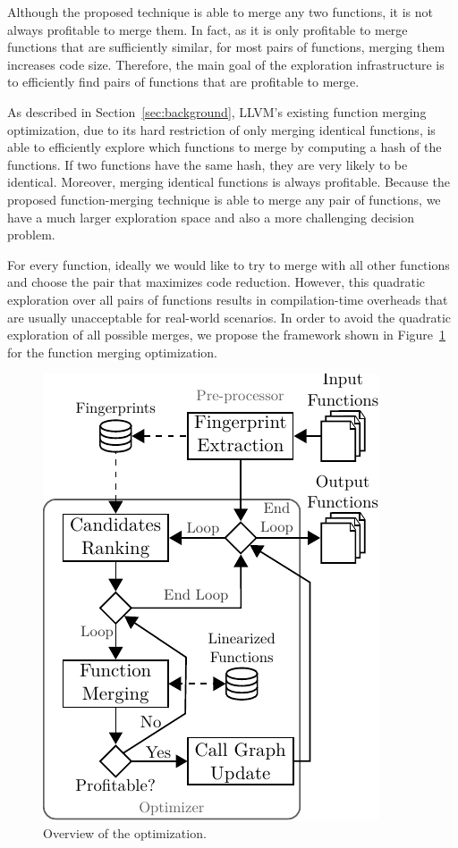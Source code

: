 Although the proposed technique is able to merge any two functions, it is not
always profitable to merge them.
In fact, as it is only profitable to merge functions that are sufficiently
similar, for most pairs of functions, merging them increases code size.
Therefore, the main goal of the exploration infrastructure is to efficiently
find pairs of functions that are profitable to merge.

As described in Section~\ref{sec:background}, LLVM's existing function merging
optimization, due to its hard restriction of only merging identical functions,
is able to  efficiently explore which functions to merge by computing a hash
of the functions.
If two functions have the same hash, they are very likely to be identical.
Moreover, merging identical functions is always profitable.
Because the proposed function-merging technique is able to merge any pair of
functions, we have a much larger exploration space and also a more challenging
decision problem.


For every function, ideally we would like to try to merge with all other
functions and choose the pair that maximizes code reduction.
However, this quadratic exploration over all pairs of functions results in 
compilation-time overheads that are usually unacceptable for real-world
scenarios.
In order to avoid the quadratic exploration of all possible merges, we propose
the framework shown in Figure~\ref{fig:func-merge-opt-arch} for the
function merging optimization.

\begin{figure}[h]
  \centering
  \includegraphics[width=0.7\linewidth]{figs/func-merge-opt-arch.pdf}
  \caption{Overview of the optimization.}
  \label{fig:func-merge-opt-arch}
\end{figure}

